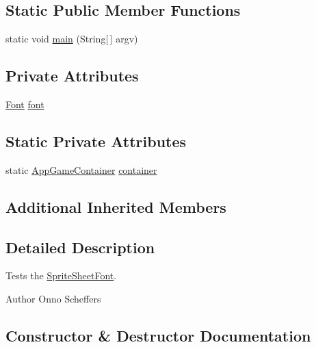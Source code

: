 \subsection*{Static Public Member Functions}
\begin{DoxyCompactItemize}
\item 
static void \mbox{\hyperlink{classorg_1_1newdawn_1_1slick_1_1tests_1_1_sprite_sheet_font_test_a8cad85695029d94b1c04689802d82ada}{main}} (String\mbox{[}$\,$\mbox{]} argv)
\end{DoxyCompactItemize}
\subsection*{Private Attributes}
\begin{DoxyCompactItemize}
\item 
\mbox{\hyperlink{interfaceorg_1_1newdawn_1_1slick_1_1_font}{Font}} \mbox{\hyperlink{classorg_1_1newdawn_1_1slick_1_1tests_1_1_sprite_sheet_font_test_a910b79c0adb99fde6f3122070d2a9dfa}{font}}
\end{DoxyCompactItemize}
\subsection*{Static Private Attributes}
\begin{DoxyCompactItemize}
\item 
static \mbox{\hyperlink{classorg_1_1newdawn_1_1slick_1_1_app_game_container}{App\+Game\+Container}} \mbox{\hyperlink{classorg_1_1newdawn_1_1slick_1_1tests_1_1_sprite_sheet_font_test_a815648868b0f6ece0eb2952a1faeaedf}{container}}
\end{DoxyCompactItemize}
\subsection*{Additional Inherited Members}


\subsection{Detailed Description}
Tests the \mbox{\hyperlink{classorg_1_1newdawn_1_1slick_1_1_sprite_sheet_font}{Sprite\+Sheet\+Font}}.

\begin{DoxyAuthor}{Author}
Onno Scheffers 
\end{DoxyAuthor}


\subsection{Constructor \& Destructor Documentation}
\mbox{\label{classorg_1_1newdawn_1_1slick_1_1tests_1_1_sprite_sheet_font_test_adf11cf3193647a23114886b5963e6616}} 
